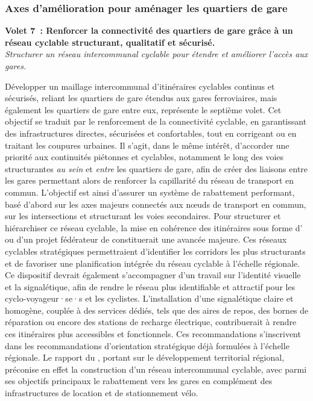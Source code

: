 \begin{refsegment}
\subsubsection*{Axes d'amélioration pour aménager les quartiers de gare
    \label{conclusion-generale:implications-amenagement}
    }

    \begin{displayquote}
\textbf{Volet 7~: Renforcer la connectivité des quartiers de gare grâce à un réseau cyclable structurant, qualitatif et sécurisé.}
\\
\textsl{Structurer un réseau intercommunal cyclable pour étendre et améliorer l'accès aux gares.}
    \end{displayquote}
Développer un maillage intercommunal d’itinéraires cyclables continus et sécurisés, reliant les quartiers de gare étendus aux gares ferroviaires, mais également les quartiers de gare entre eux, représente le septième volet. Cet objectif se traduit par le renforcement de la connectivité cyclable, en garantissant des infrastructures directes, sécurisées et confortables, tout en corrigeant ou en traitant les coupures urbaines. Il s'agit, dans le même intérêt, d'accorder une priorité aux continuités piétonnes et cyclables, notamment le long des voies structurantes \textsl{au sein} et \textsl{entre} les quartiers de gare, afin de créer des liaisons entre les gares permettant alors de renforcer la capillarité du réseau de transport en commun. L’objectif est ainsi d’assurer un système de rabattement performant, basé d'abord sur les axes majeurs connectés aux nœuds de transport en commun, sur les intersections et structurant les voies secondaires. Pour structurer et hiérarchiser ce réseau cyclable, la mise en cohérence des itinéraires sous forme d’ ou d'un projet fédérateur de  constituerait une avancée majeure. Ces réseaux cyclables stratégiques permettraient d’identifier les corridors les plus structurants et de favoriser une planification intégrée du réseau cyclable à l’échelle régionale. Ce dispositif devrait également s’accompagner d’un travail sur l’identité visuelle et la signalétique, afin de rendre le réseau plus identifiable et attractif pour les cyclo-voyageur·se·s et les cyclistes. L’installation d’une signalétique claire et homogène, couplée à des services dédiés, tels que des aires de repos, des bornes de réparation ou encore des stations de recharge électrique, contribuerait à rendre ces itinéraires plus accessibles et fonctionnels. Ces recommandations s’inscrivent dans les recommandations d'orientation stratégique déjà formulées à l’échelle régionale. Le rapport du \textcolor{blue}{\textcite[72]{ceser_hauts-de-france_mobilite_2021}}, portant sur le développement territorial régional, préconise en effet la construction d’un réseau intercommunal cyclable, avec parmi ses objectifs principaux le rabattement vers les gares en complément des infrastructures de location et de stationnement vélo.%


\end{refsegment}
